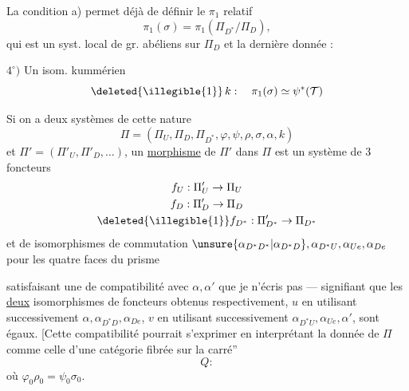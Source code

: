 
La condition a) permet déjà de définir le
$\pi_1$ relatif
\[
\pi_1(\sigma)
 = \pi_1(\Pi_{D^*}/\Pi_D),
\]
qui est un syst. local de gr.  abéliens sur $\Pi_D$
et la dernière donnée : 

$4^\circ)$ Un isom. kummérien
\[
\deleted{\illegible{1}}\,k:\quad
\pi_1(\sigma)\simeq
\psi^*(\mathcal T)
\]

Si on a deux systèmes de cette nature
\[
\Pi=(\Pi_U,\Pi_D,\Pi_{D^*},\varphi,\psi,\rho,\sigma,\alpha,k)
\]
et $\Pi'=(\Pi'_U,\Pi'_D,\ldots)$, un \uline{morphisme}
de $\Pi'$ dans $\Pi$ est un système de $3$ foncteurs
\[
\begin{gathered}
f_U:\Pi'_U\to\Pi_U\\
f_D:\Pi'_D\to\Pi_D\\
\deleted{\illegible{1}}f_{D^*}:\Pi'_{D^*}\to\Pi_{D^*}
\end{gathered}
\]
et de 
isomorphismes de commutation
$\unsure{\alpha_{D^*D^*}|\alpha_{D^*D}},\alpha_{D^*U},\alpha_{Ue},\alpha_{De}$
pour les quatre faces du prisme


satisfaisant une  de compatibilité avec $\alpha,\alpha'$ que je n'écris pas
--- signifiant que les \uline{deux}
 isomorphismes  de foncteurs
obtenus respectivement, $u$ en utilisant successivement
$\alpha,\alpha_{D^*D},\alpha_{De}$,  $v$ en
utilisant successivement $\alpha_{D^*U},\alpha_{Ue},\alpha'$, sont égaux.
[Cette compatibilité pourrait s'exprimer en interprétant la donnée
de $\Pi$ comme celle d'une catégorie
fibrée \inserted{$\Pi$} sur la 
 carré''
\[
Q:
\]
où $\varphi_0\rho_0=\psi_0\sigma_0$.

